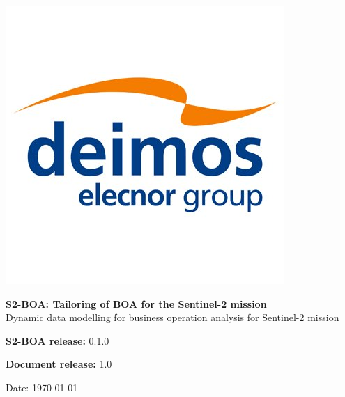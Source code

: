 %
%
%

\begin{titlepage}
	
    \includegraphics[scale=0.20]{../fig/deimos_logo.jpg}
    
    \vspace{2.0cm}
    
    	\begin{center}
    
    \vspace{2cm}
    
    \LARGE{\textbf{S2-BOA: Tailoring of BOA for the Sentinel-2 mission}} \\    
    \LARGE{Dynamic data modelling for business operation analysis for Sentinel-2 mission}
    
    	\end{center}    
    
    \vspace{7.0cm}

    \vspace{0.5cm}

    \Large{\textbf{S2-BOA release:} 0.1.0}

    \Large{\textbf{Document release:} 1.0}

    \vspace{1cm}
    
    \large{Date: \today}
    
\end{titlepage}
